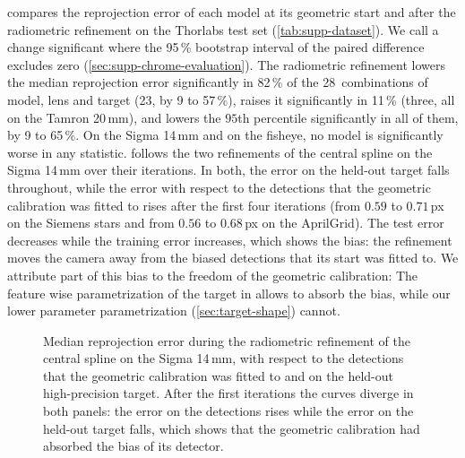  compares the reprojection error of each
model at its geometric start and after the radiometric refinement on
the Thorlabs test set (\cref{tab:supp-dataset}). We call a change significant where the 95\,\% bootstrap interval of
the paired difference excludes zero (\cref{sec:supp-chrome-evaluation}).
The radiometric refinement lowers the
median reprojection error significantly in 82\,\% of the 28\
combinations of model, lens and target (23, by 9 to 57\,\%), raises
it significantly in 11\,\% (three, all on the Tamron 20\,mm), and
lowers the $95$th percentile significantly in all of them, by 9 to
65\,\%. On the Sigma 14\,mm and on the fisheye, no model is
significantly worse in any statistic.
 follows the two refinements of the
central spline on the Sigma 14\,mm over their iterations. In both,
the error on the held-out target falls throughout, while the error
with respect to the detections that the geometric calibration was
fitted to rises after the first four iterations (from $0.59$ to
$0.71$\,px on the Siemens stars and from $0.56$ to $0.68$\,px on the
AprilGrid). The test error decreases while the training error
increases, which shows the bias: the refinement moves the camera
away from the biased detections that its start was fitted to. We attribute part of this bias to the freedom of the
geometric calibration: The feature wise parametrization of the target in \cite{10000params} allows to absorb the bias, while our lower parameter parametrization (\cref{sec:target-shape}) cannot. 

\begin{figure}[t]
        \centering
        
        \caption{Median reprojection error during the radiometric refinement of the central spline on the Sigma 14\,mm, with respect to the detections that the geometric calibration was fitted to and on the held-out high-precision target. After the first iterations the curves diverge in both panels: the error on the detections rises while the error on the held-out target falls, which shows that the geometric calibration had absorbed the bias of its detector.}
        \label{fig:convergence-rms}
\end{figure}

